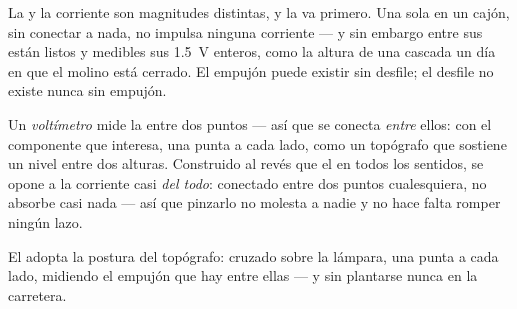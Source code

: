 \begin{proposition}\label{prop:g8:voltage-voltmeter:nocurrent}
La  y la corriente son magnitudes distintas, y la
 va primero. Una  sola en un cajón, sin
conectar a nada, no impulsa ninguna corriente --- y sin embargo entre
sus  están listos y medibles sus \qty{1.5}{V} enteros, como
la altura de una cascada un día en que el molino está cerrado. El
empujón puede existir sin desfile; el desfile no existe nunca sin
empujón.
\end{proposition}

\begin{definition}[Voltímetro]\label{def:g8:voltage-voltmeter:voltmeter}
Un \emph{voltímetro} mide la
 entre dos puntos --- así que se conecta \emph{entre}
ellos: \emph{} con el componente que interesa, una
punta a cada lado, como un topógrafo que sostiene un nivel entre dos
alturas. Construido al revés que el  en todos los
sentidos, se opone a la corriente casi \emph{del todo}: conectado entre
dos puntos cualesquiera, no absorbe casi nada --- así que pinzarlo no
molesta a nadie y no hace falta romper ningún lazo.
\end{definition}

\begin{omfigure}

{\small El  adopta la postura del topógrafo: cruzado
sobre la lámpara, una punta a cada lado, midiendo el empujón que hay
entre ellas --- y sin plantarse nunca en la carretera.}
\end{omfigure}

